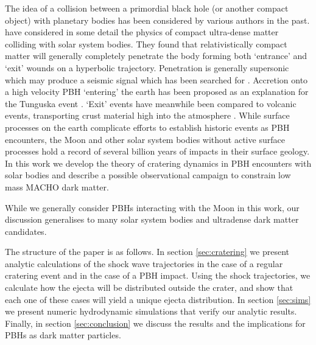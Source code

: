 \documentclass[usenatbib]{mnras}
\begin{document}
The idea of a collision between a primordial black hole (or another compact object) with planetary bodies has been considered by various authors in the past.  \cite{Rafelski2013CompactImpactors} have considered in some detail the physics of compact ultra-dense matter colliding with solar system bodies. They found that relativistically compact matter will generally completely penetrate the body forming both `entrance' and `exit' wounds on a hyperbolic trajectory. Penetration is generally supersonic which may produce a seismic signal \citep{Khriplovich2008CanEarth} which has been searched for \citep{ Herrin2006SeismicNuggets, Banerdt2007UsingNuggets, Horowitz2020GravimeterEarth}. Accretion onto a high velocity PBH `entering' the earth has been proposed as an explanation for the Tunguska event \citep{Jackson1973WasHole}. `Exit' events have meanwhile been compared to volcanic events, transporting crust material high into the atmosphere \citep{Rafelski2013CompactImpactors, Rafelski2013CompactSystem}. While surface processes on the earth complicate efforts to establish historic events as PBH encounters, the Moon and other solar system bodies without active surface processes hold a record of several billion years of impacts in their surface geology. In this work we develop the theory of cratering dynamics in PBH encounters with solar bodies and describe a possible observational campaign to constrain low mass MACHO dark matter. 

While we generally consider PBHs interacting with the Moon in this work, our discussion generalises to many solar system bodies and ultradense dark matter candidates.

The structure of the paper is as follows. In section \ref{sec:cratering} we present analytic calculations of the shock wave trajectories in the case of a regular cratering event and in the case of a PBH impact. Using the shock trajectories, we calculate how the ejecta will be distributed outside the crater, and show that each one of these cases will yield a unique ejecta distribution. In section \ref{sec:sims} we present numeric hydrodynamic simulations that verify our analytic results. Finally, in section \ref{sec:conclusion} we discuss the results and the implications for PBHs as dark matter particles.



\end{document}
